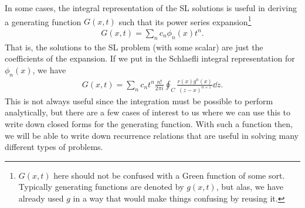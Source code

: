 In some cases, the integral representation of the SL solutions is useful in deriving a generating function $G(x,t)$ such that its power series expansion\footnote{$G(x,t)$ here should not be confused with a Green function of some sort. Typically generating functions are denoted by $g(x,t)$, but alas, we have already used $g$ in a way that would make things confusing by reusing it.}
\begin{eqnarray}
    G(x,t) = \sum_{n} c_{n} \phi_{n}(x) t^{n}
.\end{eqnarray}
That is, the solutions to the SL problem (with some scalar) are just the coefficients of the expansion.
If we put in the Schlaefli integral representation for $\phi_{n}(x)$, we have
\begin{eqnarray}
    G(x,t) = \sum_{n} c_{n} t^{n} \frac{n!}{2 \pi i} \oint_{C} \frac{r(x) g^{n}(x)}{(z - x)^{n+1}} \dd{z}
.\end{eqnarray}
This is not always useful since the integration must be possible to perform analytically, but there are a few cases of interest to us where we can use this to write down closed forms for the generating function.
With such a function then, we will be able to write down recurrence relations that are useful in solving many different types of problems.












